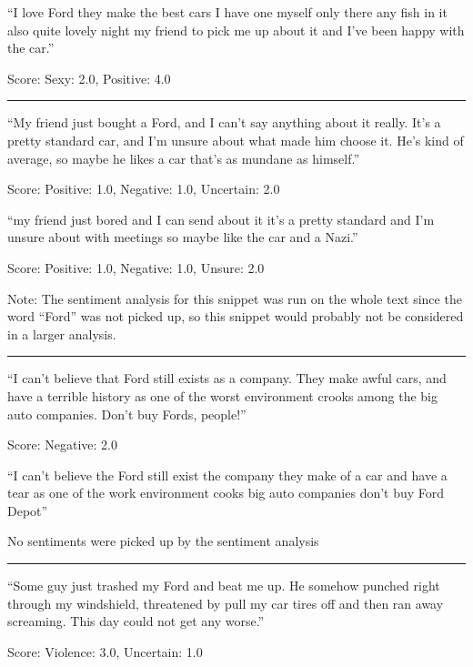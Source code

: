 \documentclass[a4paper,12pt,twoside]{ltxdoc}
\newcommand*\sepline{%
  \begin{center}
    \rule[1ex]{.5\textwidth}{.5pt}
  \end{center}}
\begin{document}
\begin{center}
``I love Ford they make the best cars I have one myself only there any fish in it also quite lovely night my friend to pick me up about it and I've been happy with the car.''
\end{center}
\hfill Score: Sexy: 2.0, Positive: 4.0

\sepline

\begin{center}
``My friend just bought a Ford, and I can't say anything about it really. It's a pretty standard car, and I'm unsure about what made him choose it. He's kind of average, so maybe he likes a car that's as mundane as himself.''
\end{center}
\hfill Score: Positive: 1.0, Negative: 1.0, Uncertain: 2.0

\begin{center}
``my friend just bored and I can send about it it's a pretty standard and I'm unsure about with meetings so maybe like the car and a Nazi.''
\end{center}
\hfill Score: Positive: 1.0, Negative: 1.0, Unsure: 2.0

Note: The sentiment analysis for this snippet was run on the whole text since the word ``Ford'' was not picked up, so this snippet would probably not be considered in a larger analysis.

\sepline

\begin{center}
``I can't believe that Ford still exists as a company. They make awful cars, and have a terrible history as one of the worst environment crooks among the big auto companies. Don't buy Fords, people!''
\end{center}
\hfill Score: Negative: 2.0

\begin{center}
``I can't believe the Ford still exist the company they make of a car and have a tear as one of the work environment cooks big auto companies don't buy Ford Depot''
\end{center}
\hfill No sentiments were picked up by the sentiment analysis

\sepline 

\begin{center}
``Some guy just trashed my Ford and beat me up. He somehow punched right through my windshield, threatened by pull my car tires off and then ran away screaming. This day could not get any worse.''
\end{center}
\hfill Score: Violence: 3.0, Uncertain: 1.0
\end{document}
